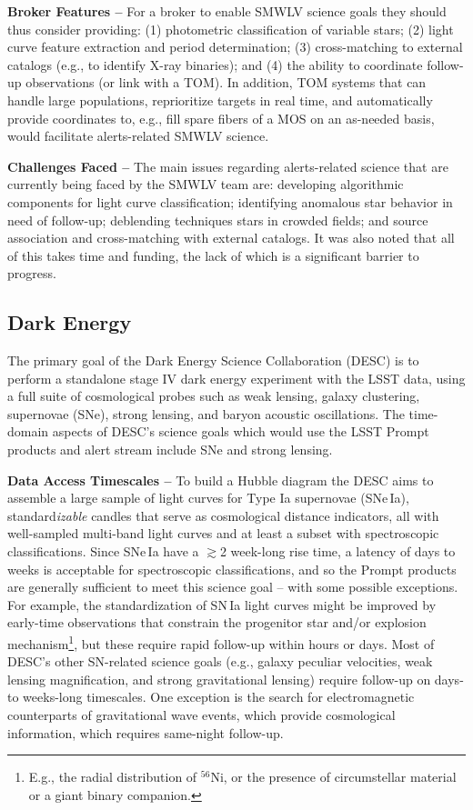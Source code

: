 {\bf Broker Features --}
For a broker to enable SMWLV science goals they should thus consider providing: 
(1) photometric classification of variable stars;
(2) light curve feature extraction and period determination;
(3) cross-matching to external catalogs (e.g., to identify X-ray binaries); and
(4) the ability to coordinate follow-up observations (or link with a TOM). 
In addition, TOM systems that can handle large populations, reprioritize targets in real time, and automatically provide coordinates to, e.g., fill spare fibers of a MOS on an as-needed basis, would facilitate alerts-related SMWLV science.

{\bf Challenges Faced --}
The main issues regarding alerts-related science that are currently being faced by the SMWLV team are: 
developing algorithmic components for light curve classification;
identifying anomalous star behavior in need of follow-up; 
deblending techniques stars in crowded fields; and
source association and cross-matching with external catalogs.
It was also noted that all of this takes time and funding, the lack of which is a significant barrier to progress.

\subsection{Dark Energy}\label{ssec:sci_desc}

The primary goal of the Dark Energy Science Collaboration (DESC) is to perform a standalone stage IV dark energy experiment with the LSST data, using a full suite of cosmological probes such as weak lensing, galaxy clustering, supernovae (SNe), strong lensing, and baryon acoustic oscillations.
The time-domain aspects of DESC's science goals which would use the LSST Prompt products and alert stream include SNe and strong lensing. 

{\bf Data Access Timescales --}
To build a Hubble diagram the DESC aims to assemble a large sample of light curves for Type Ia supernovae (SNe\,Ia), standard{\it izable} candles that serve as cosmological distance indicators, all with well-sampled multi-band light curves and at least a subset with spectroscopic classifications.
Since SNe\,Ia have a $\gtrsim$2 week-long rise time, a latency of days to weeks is acceptable for spectroscopic classifications, and so the Prompt products are generally sufficient to meet this science goal -- with some possible exceptions.
For example, the standardization of SN\,Ia light curves might be improved by early-time observations that constrain the progenitor star and/or explosion mechanism\footnote{E.g., the radial distribution of $^{56}$Ni, or the presence of circumstellar material or a giant binary companion.}, but these require rapid follow-up within hours or days.
Most of DESC's other SN-related science goals (e.g., galaxy peculiar velocities, weak lensing magnification, and strong gravitational lensing) require follow-up on days- to weeks-long timescales. 
One exception is the search for electromagnetic counterparts of gravitational wave events, which provide cosmological information, which requires same-night follow-up.

